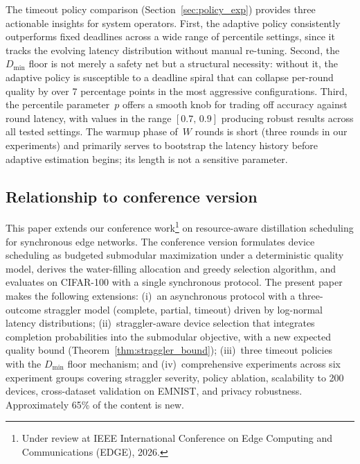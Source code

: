\documentclass[a4paper,fleqn]{cas-dc}
\begin{document}
	The timeout policy comparison (Section~\ref{sec:policy_exp})
	provides three actionable insights for system operators.  First, the
	adaptive policy consistently outperforms fixed deadlines across a
	wide range of percentile settings, since it tracks the evolving
	latency distribution without manual re-tuning.  Second, the
	$D_{\min}$ floor is not merely a safety net but a structural
	necessity: without it, the adaptive policy is susceptible to a
	deadline spiral that can collapse per-round quality by over 7
	percentage points in the most aggressive configurations.  Third, the
	percentile parameter~$p$ offers a smooth knob for trading off
	accuracy against round latency, with values in the range
	$[0.7,\, 0.9]$ producing robust results across all tested settings.
	The warmup phase of~$W$ rounds is short (three rounds in our
	experiments) and primarily serves to bootstrap the latency history
	before adaptive estimation begins; its length is not a sensitive
	parameter.
	
	\subsection{Relationship to conference version}\label{sec:relationship}
	
	This paper extends our conference work\footnote{Under review at IEEE International Conference on Edge Computing and Communications (EDGE), 2026.} on resource-aware distillation
	scheduling for synchronous edge networks.  The conference version
	formulates device scheduling as budgeted submodular maximization
	under a deterministic quality model, derives the water-filling
	allocation and greedy selection algorithm, and evaluates on CIFAR-100
	with a single synchronous protocol.  The present paper makes the
	following extensions: (i)~an asynchronous protocol with a
	three-outcome straggler model (complete, partial, timeout) driven by
	log-normal latency distributions; (ii)~straggler-aware device
	selection that integrates completion probabilities into the
	submodular objective, with a new expected quality bound
	(Theorem~\ref{thm:straggler_bound}); (iii)~three timeout policies
	with the $D_{\min}$ floor mechanism; and (iv)~comprehensive
	experiments across six experiment groups covering straggler severity,
	policy ablation, scalability to 200 devices, cross-dataset validation
	on EMNIST, and privacy robustness.  Approximately 65\% of the content
	is new.
	
\end{document}
